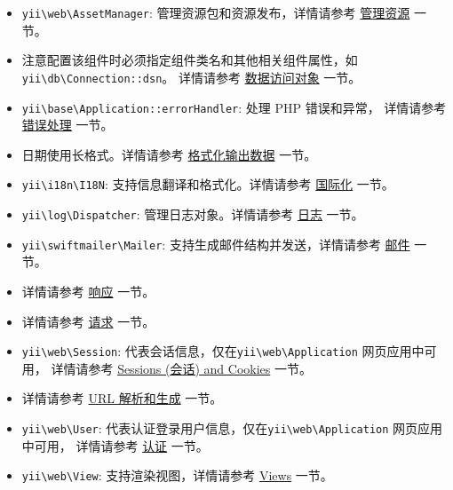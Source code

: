 \begin{itemize}
\item \texttt{yii{\allowbreak{}\textbackslash}web{\allowbreak{}\textbackslash}AssetManager}: 管理资源包和资源发布，详情请参考 \hyperref[output-assets.md]{管理资源} 一节。
\item 注意配置该组件时必须指定组件类名和其他相关组件属性，如\texttt{yii{\allowbreak{}\textbackslash}db{\allowbreak{}\textbackslash}Connection\allowbreak{}::\allowbreak{}dsn}。
详情请参考 \hyperref[db-dao.md]{数据访问对象} 一节。


\item \texttt{yii{\allowbreak{}\textbackslash}base{\allowbreak{}\textbackslash}Application\allowbreak{}::\allowbreak{}errorHandler}: 处理 PHP 错误和异常，
详情请参考 \hyperref[tutorial-handling-errors.md]{错误处理} 一节。
\item 日期使用长格式。详情请参考 \hyperref[output-formatting.md]{格式化输出数据} 一节。


\item \texttt{yii{\allowbreak{}\textbackslash}i18n{\allowbreak{}\textbackslash}I18N}: 支持信息翻译和格式化。详情请参考 \hyperref[tutorial-i18n.md]{国际化} 一节。
\item \texttt{yii{\allowbreak{}\textbackslash}log{\allowbreak{}\textbackslash}Dispatcher}: 管理日志对象。详情请参考 \hyperref[tutorial-logging.md]{日志} 一节。
\item \texttt{yii{\allowbreak{}\textbackslash}swiftmailer{\allowbreak{}\textbackslash}Mailer}: 支持生成邮件结构并发送，详情请参考 \hyperref[tutorial-mailing.md]{邮件} 一节。
\item 详情请参考 \hyperref[runtime-responses.md]{响应} 一节。


\item 详情请参考 \hyperref[runtime-requests.md]{请求} 一节。


\item \texttt{yii{\allowbreak{}\textbackslash}web{\allowbreak{}\textbackslash}Session}: 代表会话信息，仅在\texttt{yii{\allowbreak{}\textbackslash}web{\allowbreak{}\textbackslash}Application} 网页应用中可用，
详情请参考 \hyperref[runtime-sessions-cookies.md]{Sessions (会话) and Cookies} 一节。
\item 详情请参考 \hyperref[runtime-url-handling.md]{URL 解析和生成} 一节。


\item \texttt{yii{\allowbreak{}\textbackslash}web{\allowbreak{}\textbackslash}User}: 代表认证登录用户信息，仅在\texttt{yii{\allowbreak{}\textbackslash}web{\allowbreak{}\textbackslash}Application} 网页应用中可用，
详情请参考 \hyperref[security-authentication.md]{认证} 一节。
\item \texttt{yii{\allowbreak{}\textbackslash}web{\allowbreak{}\textbackslash}View}: 支持渲染视图，详情请参考 \hyperref[structure-views.md]{Views} 一节。
\end{itemize}


